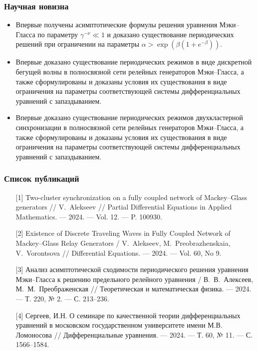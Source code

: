 \begin{frame}
    \frametitle{Научная новизна}
    \begin{itemize}
    	\item Впервые получены асимптотические формулы решения уравнения Мэки--Гласса по параметру $\gamma^{-\nu} \ll 1$ и доказано существование периодических решений при ограничении на параметры $\alpha > \exp\left(\beta(1 + e^{-\beta})\right)$.
    	\item Впервые доказано существование периодических режимов в виде дискретной бегущей волны в полносвязной сети релейных генераторов Мэки--Гласса, а также сформулированы и доказаны условия их существования в виде ограничения на параметры соответствующей системы дифференциальных уравнений с запаздыванием.
    	\item Впервые доказано существование периодических режимов двухкластерной синхронизации в полносвязной сети релейных генераторов Мэки--Гласса, а также сформулированы и доказаны условия их существования в виде ограничения на параметры соответствующей системы дифференциальных уравнений с запаздыванием.
    \end{itemize}
\end{frame}

\begin{frame} %
	\frametitle{Список публикаций}
	\begin{itemize}
		\item[{[1]}] Two-cluster synchronization on a fully coupled network of Mackey--Glass generators // V.~Alekseev // Partial Differential Equations in Applied Mathematics. --- 2024. --- Vol. 12. --- P. 100930.
		\item[{[2]}] Existence of Discrete Traveling Waves in Fully Coupled Network of Mackey--Glass Relay Generators / V.~Alekseev, M.~Preobrazhenskaia, V.~Vorontsova // Differential Equations. --- 2024. --- Vol. 60, No 9.
		\item[{[3]}] Анализ асимптотической сходимости периодического решения уравнения Мэки--Гласса к решению предельного релейного уравнения / В.~В.~Алексеев, М.~М.~Преображенская // Теоретическая и математическая физика. --- 2024. --- Т. 220, № 2. --- С. 213--236.
		\item[{[4]}] Сергеев, И.Н. О семинаре по качественной теории дифференциальных уравнений в московском государственном университете имени М.В. Ломоносова // Дифференциальные уравнения. --- 2024. --- Т. 60, № 11. --- С. 1566--1584.
    \end{itemize}
\end{frame}

